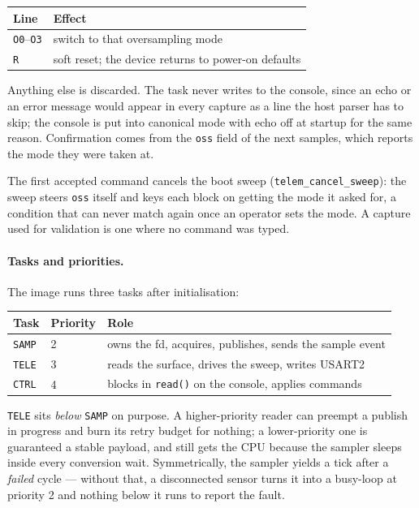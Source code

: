 \documentclass[10pt,a4]{article}
\begin{document}
\begin{center}
\begin{tabular}{ll}
Line & Effect \\
\hline
\texttt{O0}--\texttt{O3} & switch to that oversampling mode \\
\texttt{R} & soft reset; the device returns to power-on defaults \\
\end{tabular}
\end{center}

Anything else is discarded. The task never writes to the console, since an echo
or an error message would appear in every capture as a line the host parser has
to skip; the console is put into canonical mode with echo off at startup for the
same reason. Confirmation comes from the \texttt{oss} field of the next samples,
which reports the mode they were taken at.

The first accepted command cancels the boot sweep (\texttt{telem\_cancel\_sweep}):
the sweep steers \texttt{oss} itself and keys each block on getting the mode it
asked for, a condition that can never match again once an operator sets the mode.
A capture used for validation is one where no command was typed.

\paragraph{Tasks and priorities.} The image runs three tasks after
initialisation:

\begin{center}
\begin{tabular}{lll}
Task & Priority & Role \\
\hline
\texttt{SAMP} & 2 & owns the fd, acquires, publishes, sends the sample event \\
\texttt{TELE} & 3 & reads the surface, drives the sweep, writes USART2 \\
\texttt{CTRL} & 4 & blocks in \texttt{read()} on the console, applies commands \\
\end{tabular}
\end{center}

\texttt{TELE} sits \emph{below} \texttt{SAMP} on purpose. A higher-priority
reader can preempt a publish in progress and burn its retry budget for nothing;
a lower-priority one is guaranteed a stable payload, and still gets the CPU
because the sampler sleeps inside every conversion wait. Symmetrically, the
sampler yields a tick after a \emph{failed} cycle --- without that, a
disconnected sensor turns it into a busy-loop at priority 2 and nothing below it
runs to report the fault.
\end{document}
